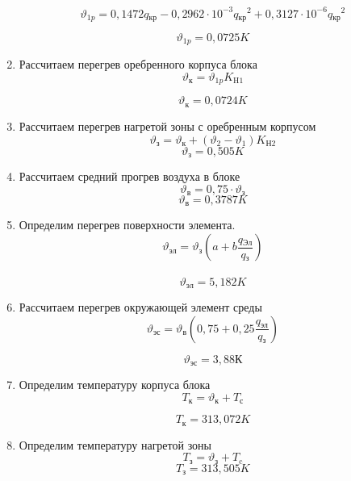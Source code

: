 \begin{enumerate}[label={\arabic*.}]
\begin{equation}
\vartheta_{1p} = 0,1472q\mathrm{_{кр}} - 0,2962 \cdot 10^{-3}q\mathrm{_{кр}}^2 + 0,3127 \cdot 10^{-6}q\mathrm{_{кр}}^2      
\end{equation}

$$\vartheta_{1p}= 0,0725K$$
\item Рассчитаем перегрев оребренного корпуса блока
  \begin{equation}
    \vartheta\mathrm{_к} =\vartheta{_{1p}}K\mathrm{_{H1}}
  \end{equation}

  $$\vartheta\mathrm{_к} = 0,0724K$$
\item Рассчитаем перегрев нагретой зоны с оребренным корпусом
  \begin{equation}
    \vartheta\mathrm{_з} = \vartheta{_к} +(\vartheta_2 - \vartheta_1)K\mathrm{_{Н2}}
  \end{equation}
  $$\vartheta\mathrm{_з} = 0,505K$$

\item Рассчитаем средний прогрев воздуха в блоке
  \begin{equation}
    \vartheta\mathrm{_в} = 0,75 \cdot \vartheta\mathrm{_з}
  \end{equation}
  $$\vartheta\mathrm{_в} = 0,3787K$$
    \item Определим перегрев поверхности элемента.
    \begin{equation}
      \vartheta\mathrm{_{эл}} = \vartheta\mathrm{_{з}}(a + b \frac{q\mathrm{_{Эл}}}{q\mathrm{_{з}}})
    \end{equation}\\

   $$\vartheta\mathrm{_{эл}} = 5,182K$$

  
  \item Рассчитаем перегрев окружающей элемент среды
    \begin{equation}
      \vartheta\mathrm{_{эс}} = \vartheta\mathrm{_в}(0,75 + 0,25\frac{q\mathrm{_{эл}}}{q\mathrm{_{з}}})
    \end{equation}

    $$\vartheta\mathrm{_{эс}} = 3,88К$$
      \item Определим температуру корпуса блока
    \begin{equation}
      T\mathrm{_к} = \vartheta\mathrm{_к} + T\mathrm{_с}
    \end{equation}

    $$T\mathrm{_к} = 313,072K$$
  \item Определим температуру нагретой зоны
    \begin{equation}
      T\mathrm{_з} = \vartheta\mathrm{_з} + T\mathrm{_c}
    \end{equation}
    $$T\mathrm{_з} = 313,505K$$


\end{enumerate}
